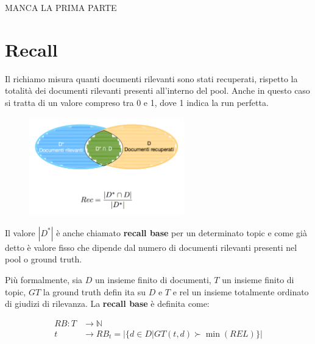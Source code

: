 

MANCA LA PRIMA PARTE

\section{Recall}

Il richiamo misura quanti documenti rilevanti sono stati recuperati, rispetto la totalità dei documenti rilevanti presenti all'interno del pool. Anche in questo caso si tratta di un valore compreso tra 0 e 1, dove 1 indica la run perfetta.

\begin{figure}[htbp]
	\centering
	\includegraphics[width=0.6\textwidth]{images/l15-fig-1.png}
\end{figure}

Il valore $|D^*|$ è anche chiamato \textbf{recall base} per un determinato topic e come già detto è valore fisso che dipende dal numero di documenti rilevanti presenti nel pool o ground truth.

Più formalmente, sia $D$ un insieme finito di documenti, $T$ un insieme finito di topic, $GT$ la ground truth defin ita su $D$ e $T$ e rel un insieme totalmente ordinato di giudizi di rilevanza. La \textbf{recall base} è definita come:

\begin{align*}
	RB : T &\to \mathbb{N} \\
		t &\to RB_t = \Big| \big\{ d \in D | GT(t,d) \succ \min(REL) \big\} \Big|
\end{align*}

